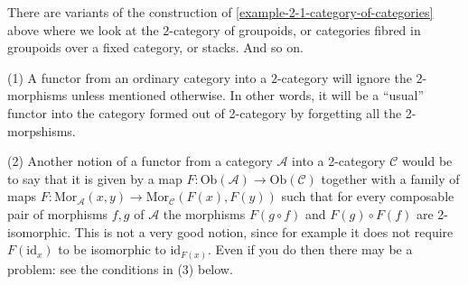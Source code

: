 \begin{remark}
\label{remark-other-2-categories}
There are variants of the construction of
\ref{example-2-1-category-of-categories} above
where we look at the $2$-category of groupoids,
or categories fibred in groupoids over a fixed
category, or stacks. And so on.
\end{remark}

\begin{remarks}
\label{remarks-functor-into-2-category}
(1) A functor from an ordinary category into a $2$-category will ignore the
$2$-morphisms unless mentioned otherwise. In other words, it will be a 
``usual'' functor into the category formed out of 2-category by forgetting
all the 2-morpshisms.

\smallskip\noindent
(2) Another notion of a functor from a category $\mathcal{A}$ into a
2-category $\mathcal{C}$ would be to say that it is given by a map
$F : \text{Ob}(\mathcal{A}) \to \text{Ob}(\mathcal{C})$ together with a
family of maps 
$F : \text{Mor}_{\mathcal{A}}(x,y) \to \text{Mor}_{\mathcal{C}}(F(x),F(y))$
such that for every composable pair of morphisms $f,g$ of $\mathcal{A}$
the morphisms $F(g \circ f)$ and $F(g) \circ F(f)$ are 2-isomorphic. This is
not a very good notion, since for example it does not require $F(\text{id}_x)$
to be isomorphic to $\text{id}_{F(x)}$. Even if you do then
there may be a problem: see the conditions in (3) below.


\end{remarks}

